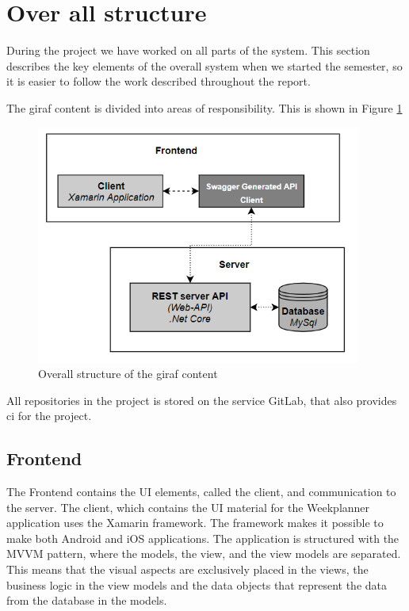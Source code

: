 \section{Over all structure}

During the project we have worked on all parts of the system. This section describes the key elements of the overall system when we started the semester, so it is easier to follow the work described throughout the report. 

The \gls{giraf} content is divided into areas of responsibility. This is shown in Figure \ref{fig:ProductStructure}

\begin{figure}[H]
    \begin{center}
        \includegraphics[width=0.95\textwidth]{figures/ProductStructure.png}
    \end{center}
    \caption{Overall structure of the \gls{giraf} content}
    \label{fig:ProductStructure}
\end{figure}

All repositories in the project is stored on the service GitLab, that also provides \gls{ci} for the project. 

\subsection{Frontend}
The Frontend contains the UI elements, called the client, and communication to the server. The client, which contains the UI material for the Weekplanner application uses the Xamarin framework. The framework makes it possible to make both Android and iOS applications. The application is structured with the MVVM pattern, where the models, the view, and the view models are separated. This means that the visual aspects are exclusively placed in the views, the business logic in the view models and the data objects that represent the data from the database in the models.

